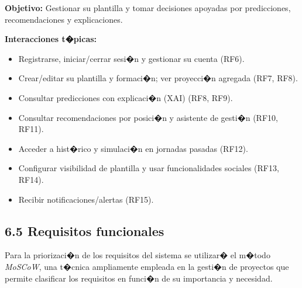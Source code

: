 \textbf{Objetivo:} Gestionar su plantilla y tomar decisiones apoyadas por predicciones, recomendaciones 
y explicaciones.

\textbf{Interacciones t�picas:}
\begin{itemize}
  \item Registrarse, iniciar/cerrar sesi�n y gestionar su cuenta (RF6).
  \item Crear/editar su plantilla y formaci�n; ver proyecci�n agregada (RF7, RF8).
  \item Consultar predicciones con explicaci�n (XAI) (RF8, RF9).
  \item Consultar recomendaciones por posici�n y asistente de gesti�n (RF10, RF11).
  \item Acceder a hist�rico y simulaci�n en jornadas pasadas (RF12).
  \item Configurar visibilidad de plantilla y usar funcionalidades sociales (RF13, RF14).
  \item Recibir notificaciones/alertas (RF15).
\end{itemize}

\subsection{6.5 Requisitos funcionales}

Para la priorizaci�n de los requisitos del sistema se utilizar� el m�todo \textit{MoSCoW}, una t�cnica ampliamente 
empleada en la gesti�n de proyectos que permite clasificar los requisitos en funci�n de su importancia y 
necesidad. 

\newcommand{\RFTable}[5]{%
\begin{table}[H]
  \centering
  \renewcommand{\arraystretch}{1.18}
  \begin{tabular}{@{}|>{\centering\arraybackslash}p{0.09\linewidth}|>{\raggedright\arraybackslash}p{0.43\linewidth}|>{\raggedright\arraybackslash}p{0.43\linewidth}|@{}}
    \hline
    \textbf{ID} & \textbf{Descripci�n} & \textbf{Historia de usuario} \\
    \hline
    \multirow{3}{*}{\textbf{#1}} & \rule{0pt}{4.2ex}#2 & \begingroup\let\\\newline #3\endgroup \\
    \cline{2-3}
    & \textbf{Informaci�n del Requisito} & \textbf{Criterios de aceptaci�n} \\
    \cline{2-3}
    & \rule{0pt}{4.2ex}\begingroup\let\\\newline #4\endgroup & \begingroup\let\\\newline #5\endgroup \\
    \hline
  \end{tabular}
  \renewcommand{\arraystretch}{1}
\end{table}
}

